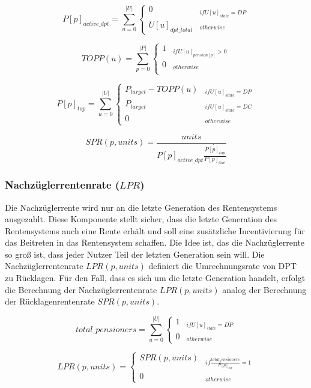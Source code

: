 \begin{equation}
P[p]_{active\_dpt} = \sum_{u=0}^{|U|} \begin{cases} 
0 & _{if U[u]_{state} = DP}\\
U[u]_{dpt\_total} & _{otherwise}
\end{cases}
\end{equation}

\begin{equation*}
TOPP(u) = \sum_{p=0}^{|P|} \begin{cases}
1 & _{if U[u]_{pension[p]} > 0}\\
0 & _{otherwise}\\
\end{cases}
\end{equation*}



\begin{equation}
P[p]_{top} = \sum_{u=0}^{|U|} \begin{cases} 
P_{target} - TOPP(u)  & _{if U[u]_{state} = DP}\\
P_{target} & _{if U[u]_{state} = DC}\\
0 & _{otherwise}
\end{cases}
\end{equation}

\begin{equation}
SPR(p, units) = \frac{units} {P[p]_{active\_dpt} \dot {\frac{P[p]_{top}} {P[p]_{auc}}}
}
\end{equation}


\subsubsection*{Nachzüglerrentenrate ($LPR$)}

Die Nachzüglerrente wird nur an die letzte Generation des 
Rentensystems ausgezahlt. Diese Komponente stellt sicher, dass die letzte
Generation des Rentensystems auch eine Rente erhält und soll eine zusätzliche Incentivierung für das Beitreten in das Rentensystem schaffen. Die Idee ist, das die Nachzüglerrente so groß ist, dass jeder Nutzer Teil der letzten Generation sein will. 
Die Nachzüglerrentenrate $LPR(p, units)$ definiert die Umrechnungsrate von DPT zu Rücklagen. Für den Fall, dass es sich um die letzte Generation handelt, erfolgt die Berechnung der Nachzüglerrentenrate $LPR(p, units)$ analog der Berechnung der Rücklagenrentenrate $SPR(p, units)$.

\begin{equation}
total\_pensioners =  \sum_{u=0}^{|U|} \begin{cases} 
1  & _{if U[u]_{state} = DP}\\
0 & _{otherwise}
\end{cases}
\end{equation}

\begin{equation}
LPR(p, units) =  \begin{cases} 
SPR(p, units)  & _{if \frac{total_pensioners} {P[p]_{top}} = 1}\\
0 & _{otherwise}
\end{cases}
\end{equation}$  $